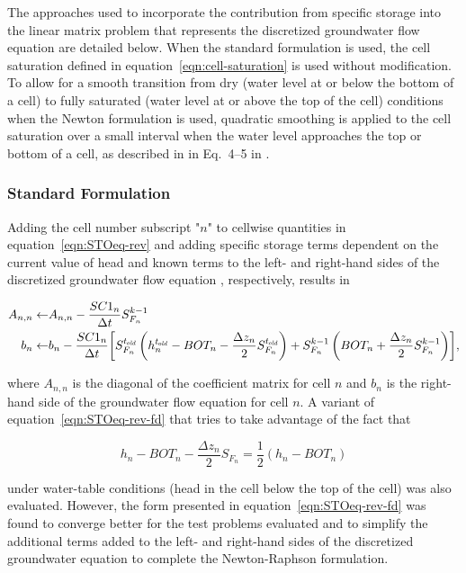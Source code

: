 The approaches used to incorporate the contribution from specific storage into the linear matrix problem that represents the discretized groundwater flow equation are detailed below. When the standard formulation is used, the cell saturation defined in equation~\ref{eqn:cell-saturation} is used without modification. To allow for a smooth transition from dry (water level at or below the bottom of a cell) to fully saturated (water level at or above the top of the cell) conditions when the Newton formulation is used, quadratic smoothing is applied to the cell saturation over a small interval when the water level approaches the top or bottom of a cell, as described in in Eq.~4--5 in \cite{modflow6gwf}. 

\subsubsection{Standard Formulation}

Adding the cell number subscript "$n$" to cellwise quantities in equation~\ref{eqn:STOeq-rev} and adding specific storage terms dependent on the current value of head and known terms to the left- and right-hand sides of the discretized groundwater flow equation \citep[eq. 6--1]{modflow6gwf}, respectively, results in

\begin{equation}
	\label{eqn:STOeq-rev-fd}
	\begin{aligned}
		A_{n,n} \leftarrow & A_{n,n} - \frac{SC1_n}{\Delta t} S_{F_n}^{k-1} \\
		b_n \leftarrow & b_n - \frac{SC1_n}{\Delta t} \biggl[ S_{F_n}^{t_\mathit{\kern -0.07em old}} \left( h_n^{t_\mathit{\kern -0.07em old}} - BOT_n - \frac{\Delta z_n}{2} S_{F_n}^{t_\mathit{\kern -0.07em old}} \right) +  S_{F_n}^{k-1} \left( BOT_n + \frac{\Delta z_n}{2} S_{F_n}^{k-1} \right) \biggr],
	\end{aligned}
\end{equation} 

\noindent where $A_{n,n}$ is the diagonal of the coefficient matrix for cell $n$ and $b_n$ is the right-hand side of the groundwater flow equation for cell $n$. A variant of equation~\ref{eqn:STOeq-rev-fd} that tries to take advantage of the fact that

\begin{equation}
	\label{eqn:hterm-WTconditions}
	h_n - BOT_n - \frac{\Delta z_n}{2} S_{F_n} = \frac{1}{2} \left( h_n - BOT_n \right)
\end{equation}

\noindent under water-table conditions (head in the cell below the top of the cell) was also evaluated. However, the form presented in equation~\ref{eqn:STOeq-rev-fd} was found to converge better for the test problems evaluated and to simplify the additional terms added to the left- and right-hand sides of the discretized groundwater equation to complete the Newton-Raphson formulation.

